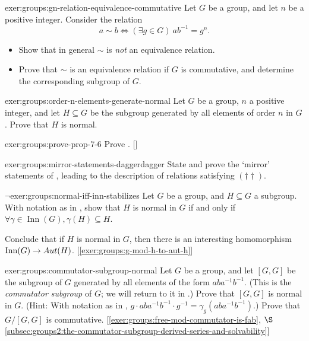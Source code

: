 \begin{exer}{}{exer:groups:gn-relation-equivalence-commutative}
  Let $G$ be a group, and let $n$ be a positive integer. Consider the
  relation
  \[
    a \sim b \iff (\exists g \in G)\ ab^{-1} = g^n.
  \]
  \begin{itemize}
  \item Show that in general $\sim$ is \emph{not} an equivalence
    relation.
  \item Prove that $\sim$ is an equivalence relation if $G$ is
    commutative, and determine the corresponding subgroup of $G$.
  \end{itemize}
\end{exer}
\begin{exer}{}{exer:groups:order-n-elements-generate-normal}
  Let $G$ be a group, $n$ a positive integer, and let $H \subseteq G$
  be the subgroup generated by all elements of order $n$ in $G$. Prove
  that $H$ is normal.
\end{exer}
\begin{exer}{\exerused}{exer:groups:prove-prop-7-6}
  Prove
  . []
\end{exer}
\begin{exer}{}{exer:groups:mirror-statements-daggerdagger}
  State and prove the `mirror' statements of
  , leading to the
  description of relations satisfying $(\dagger\dagger)$.
\end{exer}
\begin{exer}{$\lnot$}{exer:groups:normal-iff-inn-stabilizes}
  Let $G$ be a group, and $H \subseteq G$ a subgroup. With notation as
  in , show that $H$ is
  normal in $G$ if and only if
  $\forall \gamma \in \operatorname{Inn}(G), \gamma(H) \subseteq H$.

  Conclude that if $H$ is normal in $G$, then there is an interesting
  homomorphism $\operatorname{Inn}(G) \to
  Aut(H)$. [\ref{exer:groups:g-mod-h-to-aut-h}]
\end{exer}
\begin{exer}{\exerused}{exer:groups:commutator-subgroup-normal}
  Let $G$ be a group, and let $[G,G]$ be the subgroup of $G$ generated
  by all elements of the form $aba^{-1}b^{-1}$. (This is the
  \emph{commutator subgroup} of $G$; we will return to it in
  .)
  Prove that $[G,G]$ is normal in $G$. (Hint: With notation as in
  ,
  $g \cdot aba^{-1}b^{-1} \cdot g^{-1} = \gamma_g(aba^{-1}b^{-1})$.)
  Prove that $G/[G,G]$ is
  commutative. [\ref{exer:groups:free-mod-commutator-is-fab},
  $\S$\ref{subsec:groups2:the-commutator-subgroup-derived-series-and-solvability}]
\end{exer}
